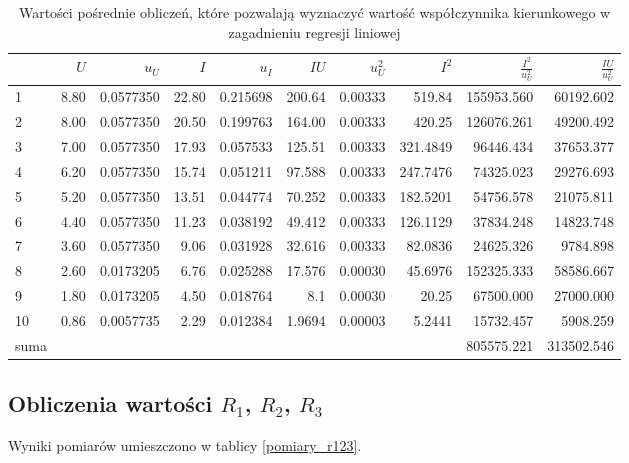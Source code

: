\documentclass[a4paper]{article}
\begin{document}
\begin{table}[h]
\centering
\begin{tabular}{lrrrrrrrrr}
\toprule
{} &  $U$  &    $u_U$  &     $I$ &    $u_I$   &    $IU$  &    $u_U^2$ &   $I^2$ &    $\frac{I^2}{u_U^2}$ & $\frac{IU}{u_U^2}$ \\
\midrule
1  &  8.80 &  0.0577350 &  22.80 &  0.215698  & 200.64   &  0.00333 &  519.84    & 155953.560  & 60192.602 \\
2  &  8.00 &  0.0577350 &  20.50 &  0.199763  & 164.00   &  0.00333 &  420.25    & 126076.261  & 49200.492 \\
3  &  7.00 &  0.0577350 &  17.93 &  0.057533  & 125.51   &  0.00333 &  321.4849  &  96446.434  & 37653.377 \\
4  &  6.20 &  0.0577350 &  15.74 &  0.051211  &  97.588  &  0.00333 &  247.7476  &  74325.023  & 29276.693 \\
5  &  5.20 &  0.0577350 &  13.51 &  0.044774  &  70.252  &  0.00333 &  182.5201  &  54756.578  & 21075.811 \\
6  &  4.40 &  0.0577350 &  11.23 &  0.038192  &  49.412  &  0.00333 &  126.1129  &  37834.248  & 14823.748 \\
7  &  3.60 &  0.0577350 &   9.06 &  0.031928  &  32.616  &  0.00333 &   82.0836  &  24625.326  &  9784.898 \\
8  &  2.60 &  0.0173205 &   6.76 &  0.025288  &  17.576  &  0.00030 &   45.6976  & 152325.333  & 58586.667 \\
9  &  1.80 &  0.0173205 &   4.50 &  0.018764  &   8.1    &  0.00030 &   20.25    &  67500.000  & 27000.000 \\
10 &  0.86 &  0.0057735 &   2.29 &  0.012384  &   1.9694 &  0.00003 &    5.2441  &  15732.457  &  5908.259 \\
\midrule
	suma & {} & {} & {} & {} & {} & {} & {} & 805575.221 & 313502.546 \\
\bottomrule
\end{tabular}
\caption{Wartości pośrednie obliczeń, które pozwalają wyznaczyć wartość współczynnika kierunkowego w zagadnieniu regresji liniowej}
\label{wartosci_posrednie}
\end{table}


\subsection{Obliczenia wartości $R_1$, $R_2$, $R_3$}

Wyniki pomiarów umieszczono w tablicy \ref{pomiary_r123}.
\end{document}
